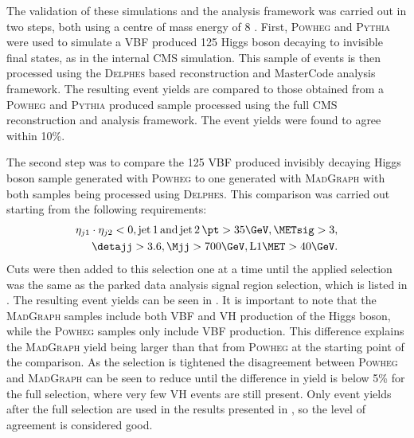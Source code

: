 The validation of these simulations and the analysis framework was carried out in two steps, both using a centre of mass energy of 8 \TeV. First, \textsc{Powheg} and \textsc{Pythia} were used to simulate a \ac{VBF} produced 125 \GeV Higgs boson decaying to invisible final states, as in the internal CMS simulation. This sample of events is then processed using the \textsc{Delphes} based reconstruction and MasterCode analysis framework. The resulting event yields are compared to those obtained from a \textsc{Powheg} and \textsc{Pythia} produced sample processed using the full CMS reconstruction and analysis framework. The event yields were found to agree within 10\%.


The second step was to compare the 125 \GeV \ac{VBF} produced invisibly decaying Higgs boson sample generated with \textsc{Powheg} to one generated with \textsc{MadGraph} with both samples being processed using \textsc{Delphes}. This comparison was carried out starting from the following requirements:
\begin{align}
  \label{eq:dmvalstart}
  \begin{split}
\eta_{j1}\cdot\eta_{j2}<0, \rm{jet\,1\,and\,jet\,2\,}\pt>35 \GeV, \METsig>3,\\ \detajj>3.6, \Mjj>700 \GeV, \rm{L1} \MET>40 \GeV.
  \end{split}
\end{align}
Cuts were then added to this selection one at a time until the applied selection was the same as the parked data analysis signal region selection, which is listed in . The resulting event yields can be seen in . It is important to note that the \textsc{MadGraph} samples include both \ac{VBF} and \ac{VH} production of the Higgs boson, while the \textsc{Powheg} samples only include \ac{VBF} production. This difference explains the \textsc{MadGraph} yield being larger than that from \textsc{Powheg} at the starting point of the comparison. As the selection is tightened the disagreement between \textsc{Powheg} and \textsc{MadGraph} can be seen to reduce until the difference in yield is below 5\% for the full selection, where very few \ac{VH} events are still present. Only event yields after the full selection are used in the results presented in , so the level of agreement is considered good.


